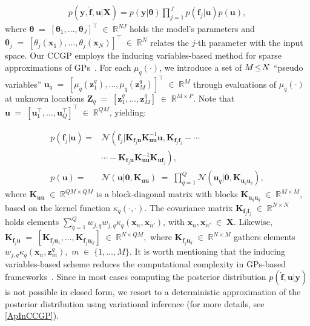 \documentclass[journal]{IEEEtran}
\providecommand{\ve}[1]{{\bm{#1}}}%
\providecommand{\mat}[1]{{\bm{#1}}} %
\newcommand{\Real}{\mathbb{R}}
\DeclareMathOperator{\en}{\!\,\in\!\,}
\DeclareMathOperator{\igual}{\!\,=\!\,}
\providecommand{\s}[1]{\negthinspace#1\negthinspace}%
\providecommand{\ve}[1]{{\mathbf{#1}}}
\providecommand{\mat}[1]{{\mathbf{#1}}}
\newcommand{\gauss}{\mathcal{N}} %
\begin{document}
\begin{align}
p(\ve{y},\hat{\ve{f}},\ve{u}|\mat{X})=p(\ve{y}|\bm{\theta}) \prod_{j=1}^{J}p(\ve{f}_j|{\ve{u}})p({\ve{u}}),
\end{align} 
where $\bm{\theta}\igual[\bm{\theta}_1,\dots ,\bm{\theta}_J]^{\top}\en\Real^{NJ}$ holds the model's parameters and $\bm{\theta}_j\igual[\theta_j(\ve{x}_1),\dots ,\theta_j(\ve{x}_N)]^{\top}\en\Real^{N}$ relates the $j$-th parameter with the input space. Our CCGP employs the inducing variables-based method for sparse approximations of GPs~\cite{hensman2015scalable}. For each $\mu_q(\cdot)$, we introduce a set of $M\s{\leq}N$ ``pseudo variables'' $\ve{u}_ q\igual [\mu_q(\ve{z}_1^q), \dots , \mu_q(\ve{z}_M^q)]^{\top}\en \Real^{M}$ through evaluations of $\mu_q(\cdot)$ at unknown locations $\mat{Z}_q \igual [\ve{z}_1^q, \dots , \ve{z}_M^q]\en \Real^{M\times P}$. Note that ${\ve{u}} \igual \left[\ve{u}_1^{\top}, \dots , \ve{u}_Q^{\top} \right]^{\top} \en \Real^{QM}$, yielding:

\begin{align}
\label{eq:CCGPprior}
p(\ve{f}_j|{\ve{u}})=& \gauss\left(\ve{f}_j|\mat{K}_{\ve{f}_j{\ve{u}}}\mat{K}^{-1}_{{\ve{u}}{\ve{u}}}{\ve{u}},\mat{K}_{\ve{f}_j\ve{f}_j}\right.-\cdots \nonumber\\
&\cdots-\left.\mat{K}_{\ve{f}_j{\ve{u}}}\mat{K}^{-1}_{{\ve{u}}{\ve{u}}}\mat{K}_{{\ve{u}}\ve{f}_j}\right),\\
p({\ve{u}}) =& \gauss\left({\ve{u}}| \ve{0}, \mat{K}_{{\ve{u}}{\ve{u}}}\right)\igual \prod_{q=1}^{Q}\gauss(\ve{u}_q|\ve{0},\mat{K}_{\ve{u}_q\ve{u}_q}),
\end{align}
where $\mat{K}_{{\ve{u}}{\ve{u}}} \en \Real^{QM\times QM}$ is a block-diagonal matrix with blocks $\mat{K}_{\ve{u}_q\ve{u}_q}\en \Real^{M\times M}$, based on the kernel function ${\kappa}_q(\cdot,\cdot)$.  The covariance matrix $\mat{K}_{\ve{f}_j\ve{f}_j}\en \Real^{N\times N}$ 
holds elements $\sum_{q=1}^{Q}w_{j,q}w_{j,q}{\kappa}_q(\ve{x}_n,\ve{x}_{n'})$, with $\ve{x}_n,\ve{x}_{n'}\en\mat{X}$. Likewise, $\mat{K}_{\ve{f}_j{\ve{u}}}\igual [\mat{K}_{\ve{f}_j\ve{u}_1}, \dots , \mat{K}_{\ve{f}_j\ve{u}_Q}]\en \Real^{N\times QM},$ where $\mat{K}_{\ve{f}_j\ve{u}_q} \en \Real^{N\times M}$ gathers elements $w_{j,q}{\kappa}_q(\ve{x}_n, \ve{z}^q_m),$ $m\en\{1,\dots,M\}.$ It is worth  mentioning  that the inducing variables-based scheme reduces the computational complexity in GPs-based frameworks~\cite{alvarez2010efficient}. Since in most cases computing the posterior distribution $p(\hat{\ve{f}},\ve{u}|\ve{y})$ is not possible in closed form, we resort to a deterministic approximation of the posterior distribution using variational inference (for more details, see \cref{ApInCCGP}). 
\end{document}
